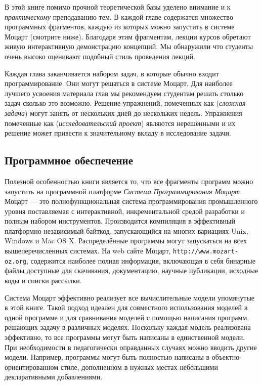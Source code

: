В этой книге помимо прочной теоретической базы уделено внимание и к \emph{практическому} преподаванию тем. В каждой главе содержатся множество программных фрагментов, каждую из которых можно запустить в системе Моцарт (смотрите ниже). Благодаря этим фрагментам, лекции курсов обретают живую интерактивную демонстрацию концепций. Мы обнаружили что студенты очень высоко оценивают подобный стиль проведения лекций.

Каждая глава заканчивается набором задач, в которые обычно входит программирование. Они могут решаться в системе Моцарт. Для наиболее лучшего усвоения материала глав мы рекомендуем студентам решать столько задач сколько это возможно. Решение упражнений, помеченных как (\emph{сложная задача}) могут занять от нескольких дней до нескольких недель. Упражнения помеченные как (\emph{исследовательский проект}) являются нерешёнными и их решение может привести к значительному вкладу в исследование задачи.

\subsection*{Программное обеспечение}

Полезной особенностью книги является то, что все фрагменты программ можно запустить на программной платформе \emph{Система Программирования Моцарт}. Моцарт --- это полнофункциональная система программирования промышленного уровня поставляемая с интерактивной, инкрементальной средой разработки и полным набором инструментов. Производится компиляция в эффективный платформно-независимый байткод, запускающийся на многих вариациях Unix, Windows и Mac OS X. Распределённые программы могут запускаться на всех вышеперечисленных системах. На web сайте Моцарт, \verb|http://www.mozart-oz.org|, содержится наиболее полная информация, включающая в себя бинарные файлы доступные для скачивания, документацию, научные публикации, исходные коды и списки рассылки.

Система Моцарт эффективно реализует все вычислительные модели упомянутые в этой книге. Такой подход идеален для совместного использования моделей в одной программе и для сравнивания моделей с помощью написания программ, решающих задачу в различных моделях. Поскольку каждая модель реализована эффективно, то все программы могут быть написаны в единственной модели. При необходимости в педагогически оправданных случаях можно вводить другие модели. Например, программы могут быть полностью написаны в объектно-ориентированном стиле, дополненном в нужных местах небольшими декларативными добавлениями.


